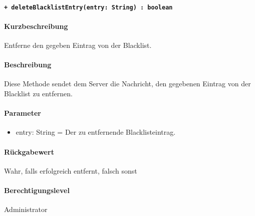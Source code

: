 \paragraph{\texttt{+ deleteBlacklistEntry(entry: String) : boolean}}%
\paragraph*{Kurzbeschreibung}
Entferne den gegeben Eintrag von der Blacklist.
\paragraph*{Beschreibung}
Diese Methode sendet dem Server die Nachricht, den gegebenen Eintrag von der Blacklist zu entfernen.
\paragraph*{Parameter}
\begin{itemize}
    \item entry: String = Der zu entfernende Blacklisteintrag.
\end{itemize}
\paragraph*{Rückgabewert}
Wahr, falls erfolgreich entfernt, falsch sonst
\paragraph*{Berechtigungslevel}
Administrator